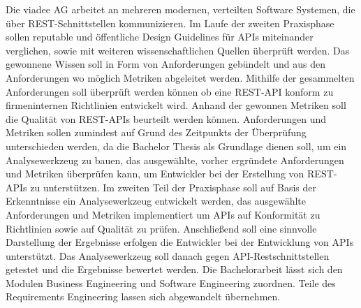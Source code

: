 \documentclass[../../expose]{subfiles}
\begin{document}
Die viadee AG arbeitet an mehreren modernen, verteilten Software Systemen, die über REST-Schnittstellen kommunizieren. Im Laufe der zweiten Praxisphase sollen reputable und öffentliche Design Guidelines für APIs miteinander verglichen, sowie mit weiteren wissenschaftlichen Quellen überprüft werden. Das gewonnene Wissen soll in Form von Anforderungen gebündelt und aus den Anforderungen wo möglich Metriken abgeleitet werden. Mithilfe der gesammelten Anforderungen soll überprüft werden können ob eine REST-API konform zu firmeninternen Richtlinien entwickelt wird. Anhand der gewonnen Metriken soll die Qualität von REST-APIs beurteilt werden können.
Anforderungen und Metriken sollen zumindest auf Grund des Zeitpunkts der Überprüfung unterschieden werden, da die Bachelor Thesis als Grundlage dienen soll, um ein Analysewerkzeug zu bauen, das ausgewählte, vorher ergründete Anforderungen und Metriken überprüfen kann, um Entwickler bei der Erstellung von REST-APIs zu unterstützen.
Im zweiten Teil der Praxisphase soll auf Basis der Erkenntnisse ein Analysewerkzeug entwickelt werden, das ausgewählte Anforderungen und Metriken implementiert um APIs auf Konformität zu Richtlinien sowie auf Qualität zu prüfen. Anschließend soll eine sinnvolle Darstellung der Ergebnisse erfolgen die Entwickler bei der Entwicklung von APIs unterstützt.  Das Analysewerkzeug soll danach gegen API-Restschnittstellen getestet und die Ergebnisse bewertet werden. 	
Die Bachelorarbeit lässt sich den Modulen Business Engineering und Software Engineering zuordnen. Teile des Requirements Engineering lassen sich abgewandelt übernehmen. 
\end{document}
